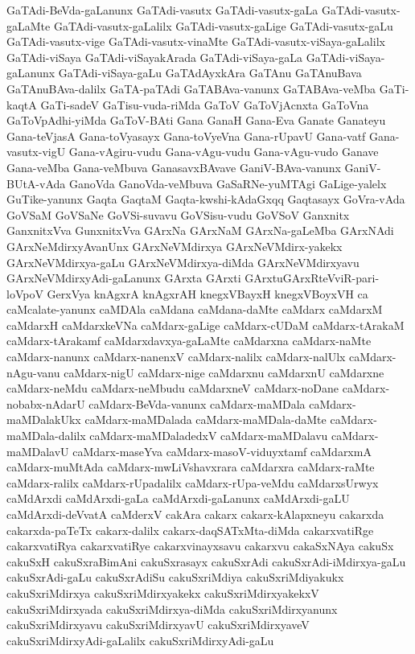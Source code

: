 {GaTAdi-BeVda-gaLanunx
GaTAdi-vasutx
GaTAdi-vasutx-gaLa
GaTAdi-vasutx-gaLaMte
GaTAdi-vasutx-gaLalilx
GaTAdi-vasutx-gaLige
GaTAdi-vasutx-gaLu
GaTAdi-vasutx-vige
GaTAdi-vasutx-vinaMte
GaTAdi-vasutx-viSaya-gaLalilx
GaTAdi-viSaya
GaTAdi-viSayakArada
GaTAdi-viSaya-gaLa
GaTAdi-viSaya-gaLanunx
GaTAdi-viSaya-gaLu
GaTAdAyxkAra
GaTAnu
GaTAnuBava
GaTAnuBAva-dalilx
GaTA-paTAdi
GaTABAva-vanunx
GaTABAva-veMba
GaTi-kaqtA
GaTi-sadeV
GaTisu-vuda-riMda
GaToV
GaToVjAcnxta
GaToVna
GaToVpAdhi-yiMda
GaToV-BAti
Gana
GanaH
Gana-Eva
Ganate
Ganateyu
Gana-teVjasA
Gana-toVyasayx
Gana-toVyeVna
Gana-rUpavU
Gana-vatf
Gana-vasutx-vigU
Gana-vAgiru-vudu
Gana-vAgu-vudu
Gana-vAgu-vudo
Ganave
Gana-veMba
Gana-veMbuva
GanasavxBAvave
GaniV-BAva-vanunx
GaniV-BUtA-vAda
GanoVda
GanoVda-veMbuva
GaSaRNe-yuMTAgi
GaLige-yalelx
GuTike-yanunx
Gaqta
GaqtaM
Gaqta-kwshi-kAdaGxqq
Gaqtasayx
GoVra-vAda
GoVSaM
GoVSaNe
GoVSi-suvavu
GoVSisu-vudu
GoVSoV
Ganxnitx
GanxnitxVva
GunxnitxVva
GArxNa
GArxNaM
GArxNa-gaLeMba
GArxNAdi
GArxNeMdirxyAvanUnx
GArxNeVMdirxya
GArxNeVMdirx-yakekx
GArxNeVMdirxya-gaLu
GArxNeVMdirxya-diMda
GArxNeVMdirxyavu
GArxNeVMdirxyAdi-gaLanunx
GArxta
GArxti
GArxtuGArxRteVviR-pari-loVpoV
GerxVya
knAgxrA
knAgxrAH
knegxVBayxH
knegxVBoyxVH
ca
caMcalate-yanunx
caMDAla
caMdana
caMdana-daMte
caMdarx
caMdarxM
caMdarxH
caMdarxkeVNa
caMdarx-gaLige
caMdarx-cUDaM
caMdarx-tArakaM
caMdarx-tArakamf
caMdarxdavxya-gaLaMte
caMdarxna
caMdarx-naMte
caMdarx-nanunx
caMdarx-nanenxV
caMdarx-nalilx
caMdarx-nalUlx
caMdarx-nAgu-vanu
caMdarx-nigU
caMdarx-nige
caMdarxnu
caMdarxnU
caMdarxne
caMdarx-neMdu
caMdarx-neMbudu
caMdarxneV
caMdarx-noDane
caMdarx-nobabx-nAdarU
caMdarx-BeVda-vanunx
caMdarx-maMDala
caMdarx-maMDalakUkx
caMdarx-maMDalada
caMdarx-maMDala-daMte
caMdarx-maMDala-dalilx
caMdarx-maMDaladedxV
caMdarx-maMDalavu
caMdarx-maMDalavU
caMdarx-maseYva
caMdarx-masoV-viduyxtamf
caMdarxmA
caMdarx-muMtAda
caMdarx-mwLiVshavxrara
caMdarxra
caMdarx-raMte
caMdarx-ralilx
caMdarx-rUpadalilx
caMdarx-rUpa-veMdu
caMdarxsUrwyx
caMdArxdi
caMdArxdi-gaLa
caMdArxdi-gaLanunx
caMdArxdi-gaLU
caMdArxdi-deVvatA
caMderxV
cakAra
cakarx
cakarx-kAlapxneyu
cakarxda
cakarxda-paTeTx
cakarx-dalilx
cakarx-daqSATxMta-diMda
cakarxvatiRge
cakarxvatiRya
cakarxvatiRye
cakarxvinayxsavu
cakarxvu
cakaSxNAya
cakuSx
cakuSxH
cakuSxraBimAni
cakuSxrasayx
cakuSxrAdi
cakuSxrAdi-iMdirxya-gaLu
cakuSxrAdi-gaLu
cakuSxrAdiSu
cakuSxriMdiya
cakuSxriMdiyakukx
cakuSxriMdirxya
cakuSxriMdirxyakekx
cakuSxriMdirxyakekxV
cakuSxriMdirxyada
cakuSxriMdirxya-diMda
cakuSxriMdirxyanunx
cakuSxriMdirxyavu
cakuSxriMdirxyavU
cakuSxriMdirxyaveV
cakuSxriMdirxyAdi-gaLalilx
cakuSxriMdirxyAdi-gaLu
}
